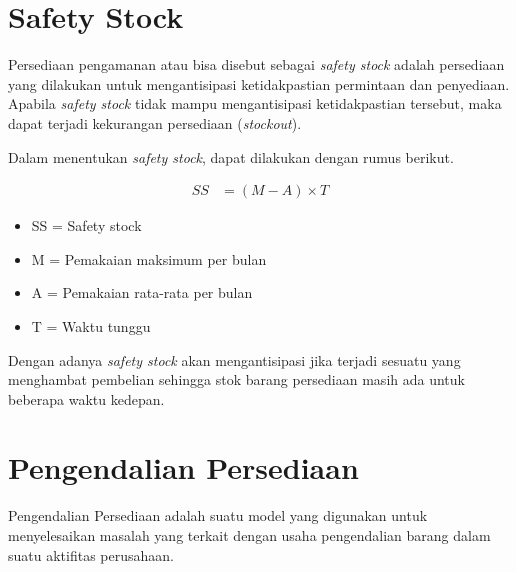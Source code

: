 



\section{Safety Stock}

Persediaan pengamanan atau bisa disebut sebagai  \textit{safety stock} adalah persediaan yang dilakukan untuk mengantisipasi ketidakpastian permintaan dan penyediaan. Apabila \textit{safety stock} tidak mampu mengantisipasi ketidakpastian tersebut, maka dapat terjadi kekurangan persediaan (\textit{stockout}).

Dalam menentukan \textit{safety stock}, dapat dilakukan dengan rumus berikut.

\begin{equation}
    \begin{split}
		SS
		&= (M - A) \times T 
    \end{split}
\end{equation}

\begin{itemize}
	\item SS = Safety stock
	\item M = Pemakaian maksimum per bulan
	\item A = Pemakaian rata-rata per bulan
	\item T = Waktu tunggu
\end{itemize}

Dengan adanya \textit{safety stock} akan mengantisipasi jika terjadi sesuatu yang menghambat pembelian sehingga stok barang persediaan masih ada untuk beberapa waktu kedepan.

\section{Pengendalian Persediaan}

Pengendalian Persediaan adalah suatu model yang digunakan untuk menyelesaikan masalah yang terkait dengan usaha pengendalian barang dalam suatu aktifitas perusahaan.

